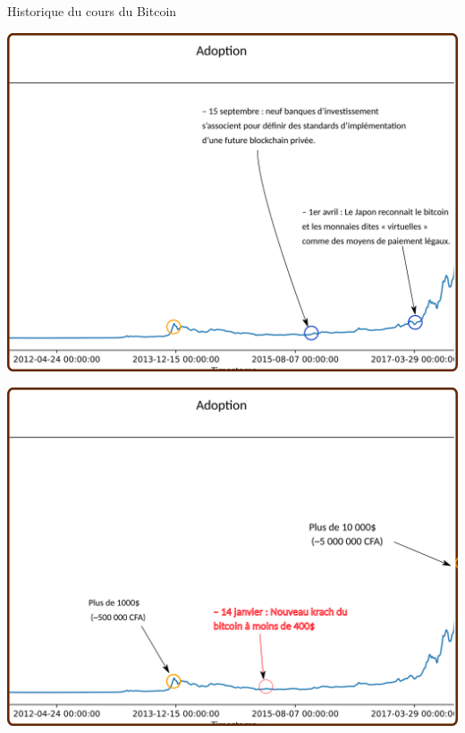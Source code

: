 \documentclass[presentation]{beamer}
\begin{document}
\begin{frame}[label={sec:org6ff9387}]{Historique du cours du Bitcoin}
\begin{block}{}
\begin{center}
\includegraphics[width=.95\textwidth]{./Pictures/Timeline/21adoption_japon.png}
\end{center}
\end{block}

\begin{block}{}
\begin{center}
\includegraphics[width=.95\textwidth]{./Pictures/Timeline/22adoption_prix.png}
\end{center}
\end{block}


\end{frame}
\end{document}
